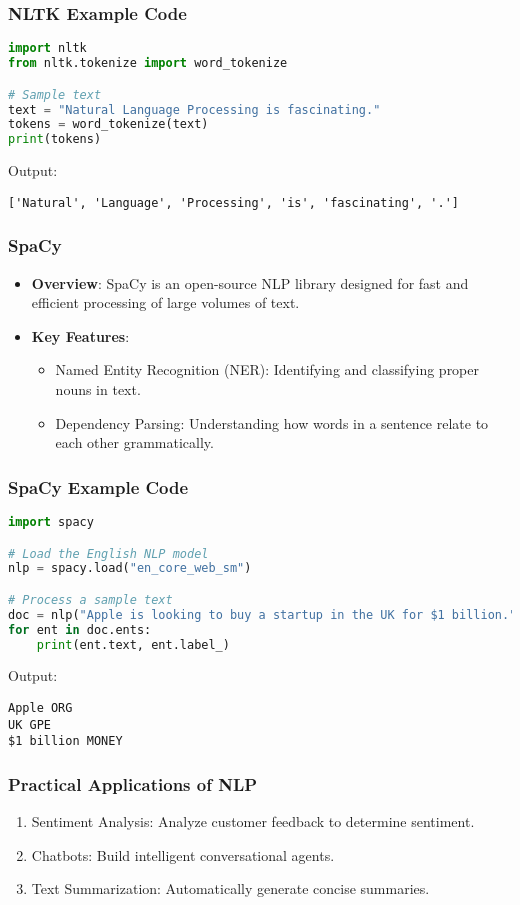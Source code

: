 \documentclass{beamer}
\begin{document}
\begin{frame}[fragile]
    \frametitle{NLTK Example Code}
    \begin{lstlisting}[language=Python]
import nltk
from nltk.tokenize import word_tokenize

# Sample text
text = "Natural Language Processing is fascinating."
tokens = word_tokenize(text)
print(tokens)
    \end{lstlisting}
    Output: 
    \begin{verbatim}
['Natural', 'Language', 'Processing', 'is', 'fascinating', '.']
    \end{verbatim}
\end{frame}

\begin{frame}[fragile]
    \frametitle{SpaCy}
    \begin{itemize}
        \item \textbf{Overview}: SpaCy is an open-source NLP library designed for fast and efficient processing of large volumes of text. 
        \item \textbf{Key Features}:
        \begin{itemize}
            \item Named Entity Recognition (NER): Identifying and classifying proper nouns in text.
            \item Dependency Parsing: Understanding how words in a sentence relate to each other grammatically.
        \end{itemize}
    \end{itemize}
\end{frame}

\begin{frame}[fragile]
    \frametitle{SpaCy Example Code}
    \begin{lstlisting}[language=Python]
import spacy

# Load the English NLP model
nlp = spacy.load("en_core_web_sm")

# Process a sample text
doc = nlp("Apple is looking to buy a startup in the UK for $1 billion.")
for ent in doc.ents:
    print(ent.text, ent.label_)
    \end{lstlisting}
    Output: 
    \begin{verbatim}
Apple ORG
UK GPE
$1 billion MONEY
    \end{verbatim}
\end{frame}

\begin{frame}[fragile]
    \frametitle{Practical Applications of NLP}
    \begin{enumerate}
        \item Sentiment Analysis: Analyze customer feedback to determine sentiment.
        \item Chatbots: Build intelligent conversational agents.
        \item Text Summarization: Automatically generate concise summaries.
    \end{enumerate}
\end{frame}
\end{document}
